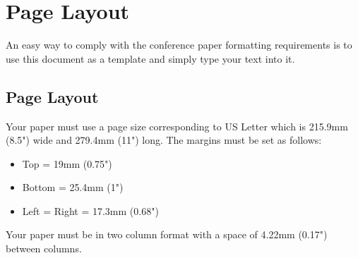 \section{Page Layout}

An easy way to comply with the conference paper formatting
requirements is to use this document as a template and simply type
your text into it.

\subsection{Page Layout}

Your paper must use a page size corresponding to US Letter which is
215.9mm (8.5") wide and 279.4mm (11") long.  The margins must be
set as follows:

\begin{itemize}
\item	Top = 19mm (0.75")
\item	Bottom = 25.4mm (1")
\item	Left = Right = 17.3mm (0.68")
\end{itemize}

Your paper must be in two column format with a space of 4.22mm
(0.17") between columns. 
